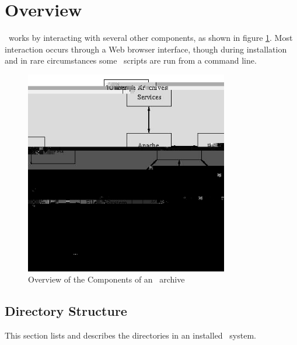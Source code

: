 
\section{Overview}

\eprints\ works by interacting with several other components, as shown in figure \ref{fig_components}. Most interaction occurs through a Web browser interface, though during installation and in rare circumstances some \eprints\ scripts are run from a command line.

\begin{figure}
\centerline{\includegraphics[width=3.5in]{images/components}}
\caption{\label{fig_components} Overview of the Components of an \eprints\ archive}
\end{figure}

\subsection{Directory Structure}

This section lists and describes the directories in an installed \eprints\ system.

